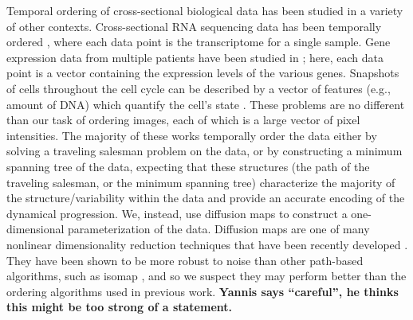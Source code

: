 \documentclass{pnastwo}
\begin{document}
\begin{article}
Temporal ordering of cross-sectional biological data has been studied in a variety of other contexts.
%
Cross-sectional RNA sequencing data has been temporally ordered \cite{anavy2014blind, trapnell2014dynamics}, where each data point is the transcriptome for a single sample.
%
Gene expression data from multiple patients have been studied in \cite{gupta2008extracting, qiu2011discovering};
here, each data point is a vector containing the expression levels of the various genes.
%
Snapshots of cells throughout the cell cycle can be described by a vector of features (e.g., amount of DNA) which quantify the cell's state  \cite{kafri2013dynamics}.
%
These problems are no different than our task of ordering images, each of which is a large vector of pixel intensities.
%
The majority of these works temporally order the data either by solving a traveling salesman problem on the data, or by constructing a minimum spanning tree of the data,
expecting that these structures (the path of the traveling salesman, or the minimum spanning tree) characterize the majority of the structure/variability within the data and provide an accurate encoding of the dynamical progression.
%
We, instead, use diffusion maps to construct a one-dimensional parameterization of the data.
%
Diffusion maps are one of many nonlinear dimensionality reduction techniques that have been recently developed \cite{Belkin2003, tenenbaum2000global, Donoho2003, Roweis2000}.
%
They have been shown to be more robust to noise than other path-based algorithms, such as isomap \cite{balasubramanian2002isomap}, and so we suspect they may perform better than the ordering algorithms used in previous work.
%
{\bf Yannis says ``careful'', he thinks this might be too strong of a statement.}
%
%


\end{article}
\end{document}

